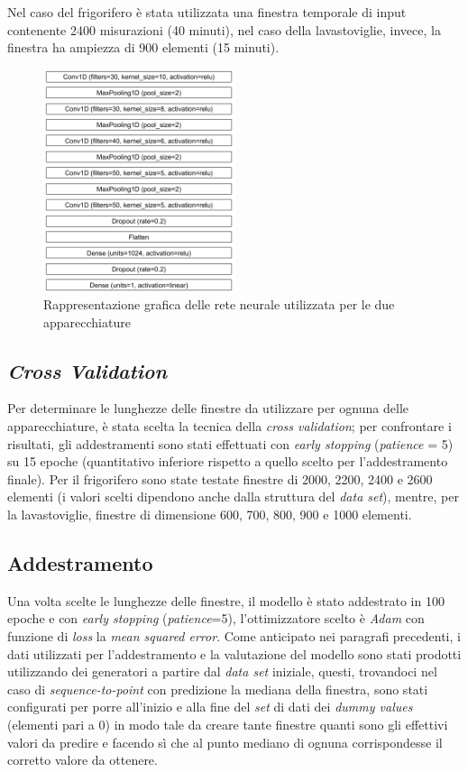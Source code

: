\documentclass[12pt,a4paper,fleqn]{article}
\begin{document}
Nel caso del frigorifero è stata utilizzata una finestra temporale di input contenente 2400 misurazioni (40 minuti), nel caso della lavastoviglie, invece, la finestra ha ampiezza di 900 elementi (15 minuti).


\begin{figure}
\centering
\includegraphics[width=0.5\textwidth]{images/model.png}
\caption{Rappresentazione grafica delle rete neurale utilizzata per le due apparecchiature}
\label{fig:modello}
\end{figure}

\subsection{\textsl{Cross Validation}}
Per determinare le lunghezze delle finestre da utilizzare per ognuna delle apparecchiature, è stata scelta la tecnica della \textsl{cross validation}; per confrontare i risultati, gli addestramenti sono stati effettuati con \textsl{early stopping} (\textsl{patience} = 5) su 15 epoche (quantitativo inferiore rispetto a quello scelto per l'addestramento finale). Per il frigorifero sono state testate finestre di 2000, 2200, 2400 e 2600 elementi (i valori scelti dipendono anche dalla struttura del \textsl{data set}), mentre, per la lavastoviglie, finestre di dimensione 600, 700, 800, 900 e 1000 elementi.

\subsection{Addestramento}
Una volta scelte le lunghezze delle finestre, il modello è stato addestrato in 100 epoche e con \textsl{early stopping} (\textsl{patience}=5), l'ottimizzatore scelto è \textsl{Adam} con funzione di \textsl{loss} la \textsl{mean squared error}. Come anticipato nei paragrafi precedenti, i dati utilizzati per l'addestramento e la valutazione del modello sono stati prodotti utilizzando dei generatori a partire dal \textsl{data set} iniziale, questi, trovandoci nel caso di \textsl{sequence-to-point} con predizione la mediana della finestra, sono stati configurati per porre all'inizio e alla fine del \textsl{set} di dati dei \textsl{dummy values} (elementi pari a 0) in modo tale da creare tante finestre quanti sono gli effettivi valori da predire e facendo sì che al punto mediano di ognuna corrispondesse il corretto valore da ottenere.
\end{document}
